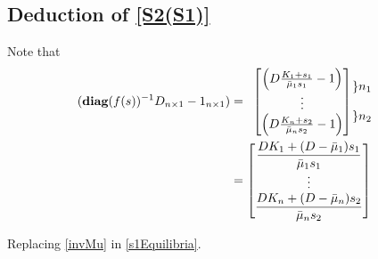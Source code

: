 \documentclass[3p,times]{article}
\newcommand{\diag}{\textbf{diag}}
\begin{document}
\subsection{Deduction of \eqref{S2(S1)}}


Note that 
\begin{align}  (\diag(f(s))^{-1}D_{n\times 1}-1_{n\times1})  & = \begin{array}{cc} 
\begin{bmatrix}
\left(D\frac{K_1+s_1}{\bar{\mu}_{1}s_1}-1 \right) \\ \vdots \\ \left(D\frac{K_n+s_2}{\bar{\mu}_{n}s_2}-1\right) 
\end{bmatrix} & \hspace{-0.5cm}\begin{array}{c} \left\} n_1\right. \\ \\ \left\} n_2\right.\end{array}
\end{array} \\
\label{invMu} 
& = \begin{bmatrix}
\dfrac{DK_1+(D-\bar{\mu}_1)s_1}{\bar{\mu}_{1}s_1} \\ \vdots \\ \dfrac{DK_n+(D-\bar{\mu}_n)s_2}{\bar{\mu}_{n}s_2} 
\end{bmatrix}
\end{align}

Replacing \eqref{invMu} in \eqref{s1Equilibria}.
\end{document}
